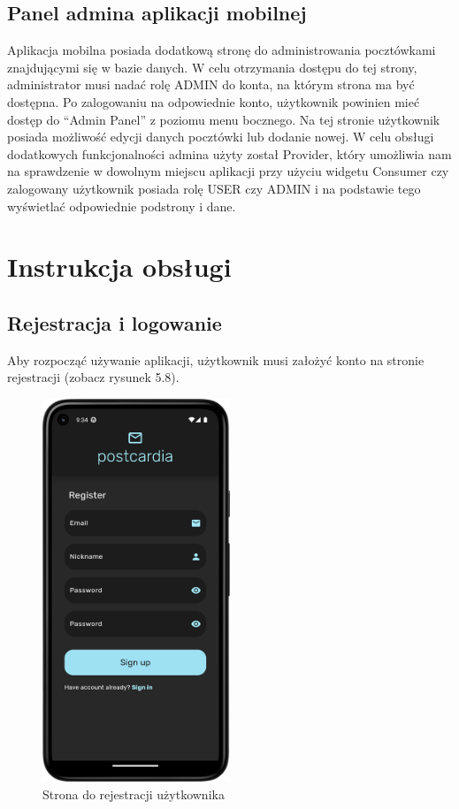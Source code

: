 \documentclass[a4paper,twoside,12pt]{book}
\begin{document}
\subsection{Panel admina aplikacji mobilnej}

Aplikacja mobilna posiada dodatkową stronę do administrowania pocztówkami znajdującymi się w bazie danych. W celu otrzymania dostępu do tej strony, administrator musi nadać rolę ADMIN do konta, na którym strona ma być dostępna. Po zalogowaniu na odpowiednie konto, użytkownik powinien mieć dostęp do ``Admin Panel'' z poziomu menu bocznego. 
Na tej stronie użytkownik posiada możliwość edycji danych pocztówki lub dodanie nowej. W celu obsługi dodatkowych funkcjonalności admina użyty został Provider, który umożliwia nam na sprawdzenie w dowolnym miejscu aplikacji przy użyciu widgetu Consumer czy zalogowany użytkownik posiada rolę USER czy ADMIN i na podstawie tego wyświetlać odpowiednie podstrony i dane.

\newpage
\section{Instrukcja obsługi}
\subsection{Rejestracja i logowanie}
Aby rozpocząć używanie aplikacji, użytkownik musi założyć konto na stronie rejestracji (zobacz rysunek 5.8).
\begin{figure}[H]
    \centering
    \includegraphics[width=0.5\textwidth]{mobile_ss/rejestracja.png}
    \caption{Strona do rejestracji użytkownika}
\end{figure}
\end{document}
